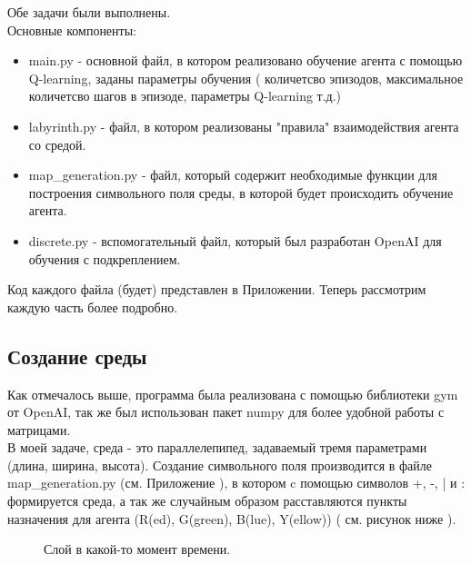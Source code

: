 \documentclass[12pt, a4paper]{report}
\theoremstyle{definition}
\theoremstyle{plain}
\theoremstyle{remark}
\theoremstyle{remark}
\theoremstyle{definition}
\begin{document}
Обе задачи были выполнены.\\ 

Основные компоненты:
\begin{itemize}
\item main.py - основной файл, в котором реализовано обучение агента с помощью Q-learning, заданы параметры обучения ( количетсво эпизодов, максимальное количетсво шагов в эпизоде, параметры Q-learning т.д.)
\item labyrinth.py - файл, в котором реализованы "правила" взаимодействия агента со средой.
\item map\_generation.py - файл, который содержит необходимые функции для построения символьного поля среды, в которой будет происходить обучение агента.
\item discrete.py - вспомогательный файл, который был разработан OpenAI для обучения с подкреплением.
 \end{itemize}

Код каждого файла (будет) представлен в Приложении.
Теперь рассмотрим каждую часть более подробно.
\subsection{Создание среды}

Как отмечалось выше, программа была реализована с помощью библиотеки gym от OpenAI, так же был использован пакет numpy для более удобной работы с матрицами. \\
В моей задаче, среда - это параллелепипед, задаваемый тремя параметрами (длина, ширина, высота). Создание символьного поля производится в файле map\_generation.py (см. Приложение ), в котором c помощью символов +, -, | и : формируется среда, а так же случайным образом расставляются пункты назначения для агента (R(ed), G(green), B(lue), Y(ellow)) ( см. рисунок ниже ).
\begin{figure}[h!]
	\caption{Слой в какой-то момент времени.}
\end{figure}
\end{document}
